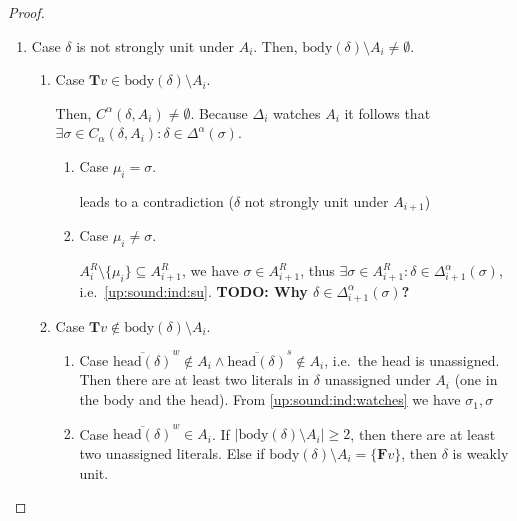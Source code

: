 \documentclass{vutinfth} %
\newcommand{\todo}[1]{{\color{red}\textbf{TODO: {#1}}}} %
\newcommand{\negstrong}[1]{\overline{#1}^s}
\newcommand{\negweak}[1]{\overline{#1}^w}
\newcommand{\ass}{A}
\newcommand{\bT}{\mathbf{T}}
\newcommand{\bF}{\mathbf{F}}
\newcommand{\dal}{\Delta^\alpha}
\newcommand{\headf}{\mathrm{head}}
\newcommand{\bodyf}{\mathrm{body}}
\newcommand{\sgl}{\mu}
\newcommand{\bsgl}{\sigma}
\begin{document}
\begin{proof}
\begin{enumerate}
\begin{enumerate}
	
	\item Case $\delta$ is not strongly unit under $A_i$. Then, $\bodyf(\delta) \setminus A_i \not = \emptyset$.


	\begin{enumerate}
		\item Case ${\bT v} \in \bodyf(\delta) \setminus A_i$.
		
		Then, $C^\alpha(\delta, A_{i}) \not = \emptyset$. Because $\Delta_i$ watches $\ass_i$ it follows that $\exists \bsgl \in C_\alpha(\delta, A_i): \delta \in \dal(\sigma)$.
		
		\begin{enumerate}
			\item Case $\sgl_i = \bsgl$.
			
			leads to a contradiction ($\delta$ not strongly unit under $A_{i+1}$)
			
			\item Case $\sgl_i \not = \bsgl$.
			
			$\ass_{i}^R \setminus \{ \sgl_i \} \subseteq \ass_{i+1}^R$, we have $\bsgl \in \ass_{i+1}^R$, thus $\exists \bsgl \in \ass_{i+1}^R : \delta \in \dal_{i+1}(\bsgl)$, i.e.~\ref{up:sound:ind:su}. \todo{Why $\delta \in \dal_{i+1}(\bsgl)$?}
		\end{enumerate}			
			
		\item Case ${\bT v} \not \in \bodyf(\delta) \setminus A_i$.
			\begin{enumerate}
				\item Case $\negweak{\headf(\delta)} \not \in A_{i} \wedge \negstrong{\headf(\delta)} \not \in A_{i}$, i.e.~the head is unassigned. Then there are at least two literals in $\delta$ unassigned under $A_i$ (one in the body and the head). From \ref{up:sound:ind:watches} we have $\bsgl_1, \bsgl $
				\item Case $\negweak{\headf(\delta)} \in A_{i}$.
				If $|\bodyf(\delta) \setminus A_i| \geq 2$, then there are at least two unassigned literals. Else if $\bodyf(\delta) \setminus A_i = \{ {\bF v} \}$, then $\delta$ is weakly unit.
			\end{enumerate}
	\end{enumerate}



\end{enumerate}
\end{enumerate}
\end{proof}
\end{document}
